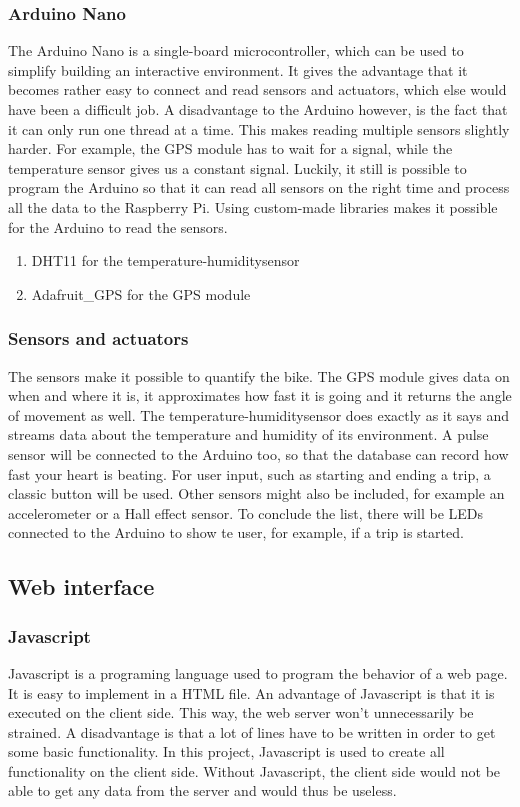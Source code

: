 \subsubsection{Arduino Nano}
The Arduino Nano is a single-board microcontroller, which can be used to simplify building an interactive environment. It gives the advantage that it becomes rather easy to connect and read sensors and actuators, which else would have been a difficult job. A disadvantage to the Arduino however, is the fact that it can only run one thread at a time. This makes reading multiple sensors slightly harder. For example, the GPS module has to wait for a signal, while the temperature sensor gives us a constant signal. Luckily, it still is possible to program the Arduino so that it can read all sensors on the right time and process all the data to the Raspberry Pi.
Using custom-made libraries makes it possible for the Arduino to read the sensors.
\begin{enumerate}
 \item DHT11 for the temperature-humiditysensor
 \item Adafruit\_GPS for the GPS module
\end{enumerate}

\subsubsection{Sensors and actuators}
The sensors make it possible to quantify the bike. The GPS module gives data on when and where it is, it approximates how fast it is going and it returns the angle of movement as well. The temperature-humiditysensor does exactly as it says and streams data about the temperature and humidity of its environment. A pulse sensor will be connected to the Arduino too, so that the database can record how fast your heart is beating. For user input, such as starting and ending a trip, a classic button will be used. Other sensors might also be included, for example an accelerometer or a Hall effect sensor. To conclude the list, there will be LEDs connected to the Arduino to show te user, for example, if a trip is started.

\subsection{Web interface}
\subsubsection{Javascript}
Javascript is a programing language used to program the behavior of a web page.
It is easy to implement in a HTML file. An advantage of Javascript is that it is
executed on the client side. This way, the web server won't unnecessarily be strained.
A disadvantage is that a lot of lines have to be written in order to get some basic
functionality. In this project, Javascript is used to create all functionality on the
client side. Without Javascript, the client side would not be able to get any data from
the server and would thus be useless. 

